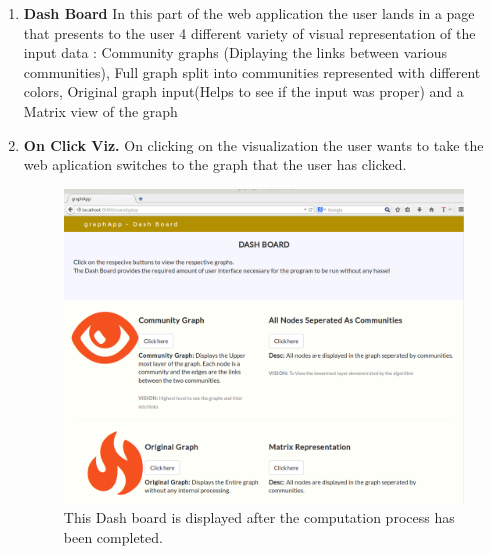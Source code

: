 \begin{enumerate}
\item \textbf{Dash Board} In this part of the web application the user lands in a page that presents to the user 4 different variety of visual representation of the input data :  Community graphs (Diplaying the links between various communities), Full graph split into communities represented with different colors, Original graph input(Helps to see if the input was proper) and a Matrix view of the graph

\item \textbf{On Click Viz.} On clicking on the visualization the user wants to take the web aplication switches to the graph that the user has clicked.

\begin{figure}[H]
\centering
\includegraphics[scale=0.3]{s4.png}
\caption{This Dash board is displayed after the computation process has been completed. }
\end{figure}



\end{enumerate}
